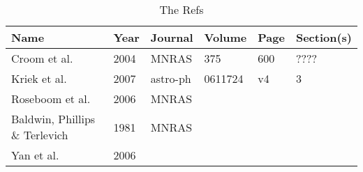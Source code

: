 \documentclass[11pt]{article}
\begin{document}
\begin{table}
  \caption{The Refs}
  \label{tab:the_ref}
  \begin{center}
    \begin{tabular}{llllll}
      \hline
      \hline 
      Name                            & Year & Journal & Volume & Page & Section(s) \\
      \hline
      Croom et al.                    & 2004 & MNRAS      & 375        & 600  & ???? \\
      Kriek et al.                    & 2007 & astro-ph   & 0611724    & v4   & 3 \\
      Roseboom et al.                 & 2006 & MNRAS      &            &      &   \\
      Baldwin, Phillips \& Terlevich  & 1981& MNRAS      &            &      &   \\
      Yan et al.                      & 2006&            &            &      & \\
      \hline
      \hline
    \end{tabular}
  \end{center}
\end{table}



\end{document}
